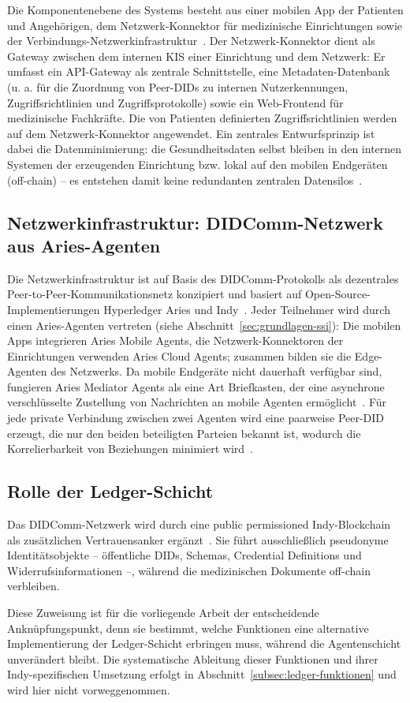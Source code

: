 Die Komponentenebene des Systems besteht aus einer mobilen App der Patienten und Angehörigen, dem Netzwerk-Konnektor für medizinische Einrichtungen sowie der Verbindungs-Netzwerkinfrastruktur~\cite{erler2023}. Der Netzwerk-Konnektor dient als Gateway zwischen dem internen KIS einer Einrichtung und dem Netzwerk: Er umfasst ein API-Gateway als zentrale Schnittstelle, eine Metadaten-Datenbank (u. a. für die Zuordnung von Peer-DIDs zu internen Nutzerkennungen, Zugriffsrichtlinien und Zugriffsprotokolle) sowie ein Web-Frontend für medizinische Fachkräfte. Die von Patienten definierten Zugriffsrichtlinien werden auf dem Netzwerk-Konnektor angewendet. Ein zentrales Entwurfsprinzip ist dabei die Datenminimierung: die Gesundheitsdaten selbst bleiben in den internen Systemen der erzeugenden Einrichtung bzw. lokal auf den mobilen Endgeräten (off-chain) -- es entstehen damit keine redundanten zentralen Datensilos~\cite{erler2023}.

\subsection{Netzwerkinfrastruktur: DIDComm-Netzwerk aus Aries-Agenten}
Die Netzwerkinfrastruktur ist auf Basis des DIDComm-Protokolls als dezentrales Peer-to-Peer-Kommunikationsnetz konzipiert und basiert auf Open-Source-Implementierungen Hyperledger Aries und Indy~\cite{erler2023}. Jeder Teilnehmer wird durch einen Aries-Agenten vertreten (siehe Abschnitt~\ref{sec:grundlagen-ssi}): Die mobilen Apps integrieren Aries Mobile Agents, die Netzwerk-Konnektoren der Einrichtungen verwenden Aries Cloud Agents; zusammen bilden sie die Edge-Agenten des Netzwerks. Da mobile Endgeräte nicht dauerhaft verfügbar sind, fungieren Aries Mediator Agents als eine Art Briefkasten, der eine asynchrone verschlüsselte Zustellung von Nachrichten an mobile Agenten ermöglicht~\cite{erler2023}. Für jede private Verbindung zwischen zwei Agenten wird eine paarweise Peer-DID erzeugt, die nur den beiden beteiligten Parteien bekannt ist, wodurch die Korrelierbarkeit von Beziehungen minimiert wird~\cite{erler2023}.

\subsection{Rolle der Ledger-Schicht}
\label{subsec:sota_ledgerschicht}
Das DIDComm-Netzwerk wird durch eine public permissioned Indy-Blockchain als zusätzlichen Vertrauensanker ergänzt~\cite{erler2023}. Sie führt ausschließlich pseudonyme Identitätsobjekte -- öffentliche DIDs, Schemas, Credential Definitions und Widerrufsinformationen --, während die medizinischen Dokumente off-chain verbleiben.

Diese Zuweisung ist für die vorliegende Arbeit der entscheidende Anknüpfungspunkt, denn sie bestimmt, welche Funktionen eine alternative Implementierung der Ledger-Schicht erbringen muss, während die Agentenschicht unverändert bleibt. Die systematische Ableitung dieser Funktionen und ihrer Indy-spezifischen Umsetzung erfolgt in Abschnitt~\ref{subsec:ledger-funktionen} und wird hier nicht vorweggenommen.